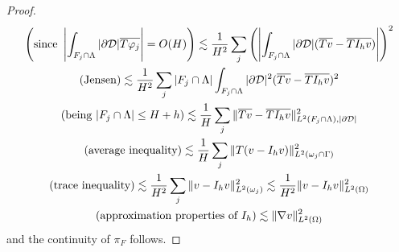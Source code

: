 \begin{proof}
\begin{multline*}
\left(\text{since }\left|\int_{F_j\cap \Lambda}|\partial\mathcal{D}|\overline{T\varphi_j}\right|=O(H)\right) \lesssim \frac {1}{H^2} \sum_j \left(\left|\int_{F_j\cap \Lambda} |\partial\mathcal{D}| (\overline{Tv}-\overline{TI_hv})\right| \right)^2
\\
(\text{Jensen}) \lesssim  \frac {1}{H^2} \sum_j |F_j\cap \Lambda| \int_{F_j\cap \Lambda} |\partial\mathcal{D}|^2(\overline{Tv}-\overline{TI_hv})^2
\\
(\text{being }|F_j\cap \Lambda| \leq H+h)\lesssim  \frac {1}{H} \sum_j \| \overline{Tv}-\overline{TI_hv}\|^2_{L^2(F_j\cap \Lambda), |\partial\mathcal{D}|}
\\
(\text{average inequality}) \lesssim  \frac {1}{H} \sum_j \| T(v-I_hv)\|^2_{L^2(\omega _j\cap \Gamma)}  
\\
\left(\text{trace inequality} \right)\lesssim  \frac {1}{H^2} \sum_j  \| v-I_h v\|^2_{L^2(\omega_j)} \lesssim  \frac {1}{H^2}  \| v-I_h v\|^2_{L^2(\Omega)} 
\\
(\text{approximation properties of }I_h)\lesssim \|\nabla  v\|^2_{L^2(\Omega)}
\end{multline*}
and the continuity of $\pi_F$ follows.
\end{proof}

